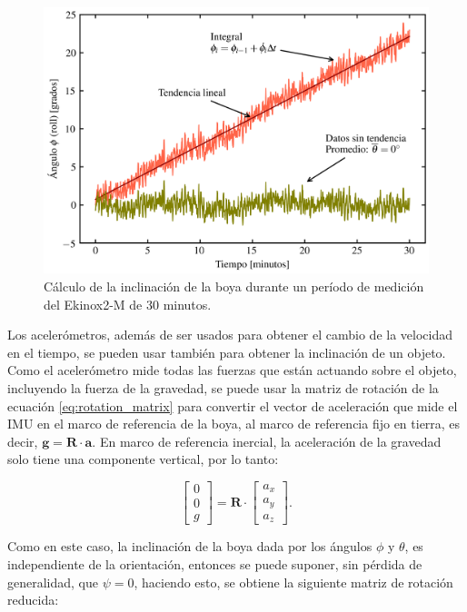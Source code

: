 \documentclass[11pt]{article}
\begin{document}
\begin{figure}[htpb]
  \centering
  \includegraphics[width=0.8\linewidth]{./figures/gyroscope_issues.png}
  \caption{
    Cálculo de la inclinación de la boya durante un período de medición del
    Ekinox2-M de 30 minutos.
  }
  \label{fig:gyroscope_issues}
\end{figure}

Los acelerómetros, además de ser usados para obtener el cambio de la velocidad
en el tiempo, se pueden usar también para obtener la inclinación de un objeto.
Como el acelerómetro mide todas las fuerzas que están actuando sobre el objeto,
incluyendo la fuerza de la gravedad, se puede usar la matriz de rotación de la
ecuación \eqref{eq:rotation_matrix} para convertir el vector de aceleración que
mide el IMU en el marco de referencia de la boya, al marco de referencia fijo en
tierra, es decir, $\mathbf{g} = \mathbf{R}\cdot\mathbf{a}$. En marco de
referencia inercial, la aceleración de la gravedad solo tiene una componente
vertical, por lo tanto:

\begin{equation}
  \left[
    \begin{array}{c}
      0 \\ 0 \\ g
    \end{array}
  \right] = \mathbf{R} \cdot
  \left[
    \begin{array}{c}
      a_x \\ a_y \\ a_z
    \end{array}
  \right].
\end{equation}

Como en este caso, la inclinación de la boya dada por los ángulos $\phi$ y
$\theta$, es independiente de la orientación, entonces se puede suponer, sin
pérdida de generalidad, que $\psi=0$, haciendo esto, se obtiene la siguiente
matriz de rotación reducida:
\end{document}
